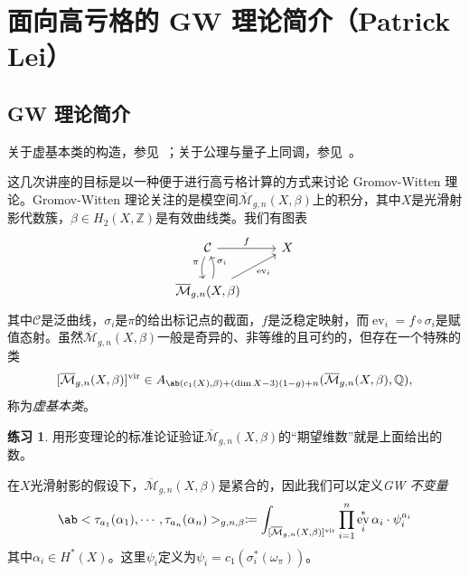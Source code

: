 \documentclass{amsart}
\theoremstyle{definition}
\newtheorem{exer}[thm]{练习}
\theoremstyle{remark}
\theoremstyle{plain}
\theoremstyle{definition}
\theoremstyle{remark}
\newcommand{\Z}{\mathbb{Z}}
\newcommand{\Q}{\mathbb{Q}}
\newcommand{\Mbar}{\overline{\mathcal{M}}}
\newcommand{\mc}[1]{\mathcal{#1}}
\newcommand{\mr}[1]{\mathrm{#1}}
\newcommand{\on}[1]{\operatorname{#1}}
\newcommand{\1}{\mathbf{1}}
\newcommand{\2}{\mathbf{2}}
\newcommand{\3}{\mathbf{3}}
\newcommand{\vir}{\mr{vir}}
\DeclareMathOperator{\ev}{ev}
\begin{document}
\section{面向高亏格的 GW 理论简介（Patrick Lei）}%
\label{sec:Intro to GW theory with a view to higher genus (Patrick Lei)}


\subsection{GW 理论简介}%
\label{sub:Introduction to GW theory}

关于虚基本类的构造，参见~\cite{BehrendFantechi1997}；关于公理与量子上同调，参见~\cite{KM1994}。

这几次讲座的目标是以一种便于进行高亏格计算的方式来讨论 Gromov-Witten 理论。Gromov-Witten 理论关注的是模空间\(\Mbar_{g,n}(X, \beta)\)上的积分，其中\(X\)是光滑射影代数簇，\(\beta \in H_2(X, \Z)\)是有效曲线类。我们有图表
\begin{equation*}
\begin{tikzcd}
    \mc{C} \ar{r}{f} \ar[bend right=20]{d}[swap]{\pi} & X \\
    \Mbar_{g,n}(X, \beta) \ar[bend right=20]{u}[swap]{\sigma_i} \ar{ur}[swap]{\on{ev}_i}
\end{tikzcd}
\end{equation*}
其中\(\mc{C}\)是泛曲线，\(\sigma_i\)是\(\pi\)的给出标记点的截面，\(f\)是泛稳定映射，而\(\ev_i = f \circ \sigma_i\)是赋值态射。虽然\(\Mbar_{g,n}(X, \beta)\)一般是奇异的、非等维的且可约的，但存在一个特殊的类
\[ [\Mbar_{g,n}(X, \beta)]^{\vir} \in A_{\ab(c_1(X), \beta) + (\dim X - 3)(1-g) + n}(\Mbar_{g,n}(X, \beta), \Q), \]
称为\textit{虚基本类}。

\begin{exer}
    用形变理论的标准论证验证\(\Mbar_{g,n}(X, \beta)\)的“期望维数”就是上面给出的数。
\end{exer}

在\(X\)光滑射影的假设下，\(\Mbar_{g,n}(X, \beta)\)是紧合的，因此我们可以定义\textit{GW 不变量}
\[ \ab<\tau_{a_1}(\alpha_1), \cdots, \tau_{a_n}(\alpha_n)>_{g,n,\beta} \coloneqq \int_{[\Mbar_{g,n}(X, \beta)]^{\vir}} \prod_{i=1}^n \ev_i^* \alpha_i \cdot \psi_i^{a_i} \]
其中\(\alpha_i \in H^*(X)\)。这里\(\psi_i\)定义为\(\psi_i = c_1(\sigma_i^*(\omega_{\pi}))\)。
\end{document}
